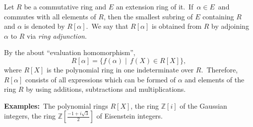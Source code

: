 \documentclass[12pt]{article}
\begin{document}
Let $R$ be a commutative ring and $E$ an extension ring of it.\, If\, $\alpha \in E$\, and commutes with all elements of $R$, then the smallest subring of $E$ containing $R$ and $\alpha$ is denoted by $R[\alpha]$.\, We say that $R[\alpha]$ is obtained from $R$ by adjoining  $\alpha$ to $R$ via {\em ring adjunction}. 

By the  about ``evaluation 
homomorphism'', 
     $$R[\alpha] = \{f(\alpha)\mid \, f(X)\in R[X]\},$$
where $R[X]$ is the polynomial ring in one indeterminate over 
$R$.\, Therefore, $R[\alpha]$ consists of all expressions which 
can be formed of $\alpha$ and elements of the ring $R$ by using 
additions, subtractions and multiplications.

\textbf{Examples:}\, The polynomial rings $R[X]$, the ring $\mathbb{Z}[i]$ of the Gaussian integers, the ring $\mathbb{Z}[\frac{-1+i\sqrt{3}}{2}]$ of Eisenstein integers.
\end{document}
